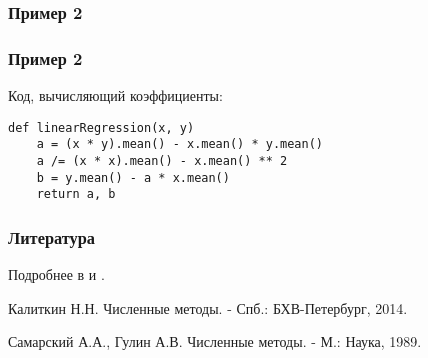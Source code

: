 \documentclass[10pt]{beamer}
\begin{document}
\begin{frame}[fragile]
\frametitle{Пример 2}

\begin{center}
\end{center}

\end{frame}


\begin{frame}[fragile]
\frametitle{Пример 2}

Код, вычисляющий коэффициенты:
\begin{lstlisting}
def linearRegression(x, y)
    a = (x * y).mean() - x.mean() * y.mean()
    a /= (x * x).mean() - x.mean() ** 2
    b = y.mean() - a * x.mean()
    return a, b
\end{lstlisting}

\end{frame}



\begin{frame}[fragile]
\frametitle{Литература}
Подробнее в \cite[стр. 44]{Kalitkin} и \cite[стр. 65]{Samarsky}.



\begin{thebibliography}{99}

Калиткин Н.Н. Численные методы. - Спб.: БХВ-Петербург, 2014.

Самарский А.А., Гулин А.В. Численные методы. - М.: Наука, 1989.

\end{thebibliography}
\end{frame}
\end{document}
